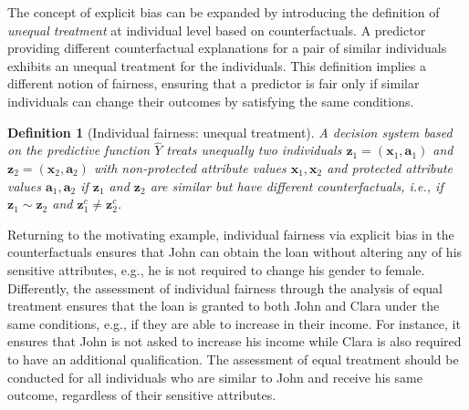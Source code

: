 \documentclass[letterpaper]{article} %
\newtheorem{definition}{Definition}
\begin{document}
The concept of explicit bias can be expanded by introducing the definition of \emph{unequal treatment} at individual level based on counterfactuals.
%
A predictor providing different counterfactual explanations for a pair of similar individuals exhibits an unequal treatment for the individuals.
%
This definition implies a different notion of fairness, ensuring that a predictor is fair only if similar individuals can change their outcomes by satisfying the same conditions. 

\begin{definition}[Individual fairness: unequal treatment]\label{unequal_treatment}
	A decision system based on the predictive function $\hat{Y}$ \emph{treats unequally} two individuals $\boldsymbol{z}_1 = (\boldsymbol{x}_1, \boldsymbol{a}_1)$ and $\boldsymbol{z}_2 = (\boldsymbol{x}_2, \boldsymbol{a}_2)$ with non-protected attribute values $\boldsymbol{x}_{1}, \boldsymbol{x}_{2}$ and protected attribute values $\boldsymbol{a}_{1}, \boldsymbol{a}_{2}$ if $\boldsymbol{z}_1$ and $\boldsymbol{z}_2$ are similar but have different counterfactuals, i.e., if $\boldsymbol{z}_1 \sim \boldsymbol{z}_2$ and $\boldsymbol{z}_1^c \neq \boldsymbol{z}_2^c$.
\end{definition}

Returning to the motivating example, individual fairness via explicit bias in the counterfactuals ensures that John can obtain the loan without altering any of his sensitive attributes, e.g., he is not required to change his gender to female.
%
Differently, the assessment of individual fairness through the analysis of equal treatment ensures that the loan is granted to both John and Clara under the same conditions, e.g., if they are able to increase in their income. For instance, it ensures that John is not asked to increase his income while Clara is also required to have an additional qualification.
%
The assessment of equal treatment should be conducted for all individuals who are similar to John and receive his same outcome, regardless of their sensitive attributes.
\end{document}
